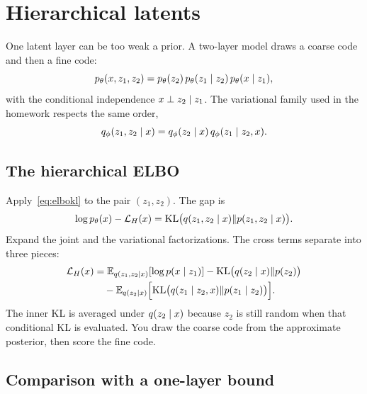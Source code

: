 \chapter{Hierarchical latents}
\label{ch:hier}

One latent layer can be too weak a prior. A two-layer model draws a coarse code and then a fine code:
\[
p_\theta(x,z_1,z_2)=p_\theta(z_2)\,p_\theta(z_1\mid z_2)\,p_\theta(x\mid z_1),
\]
with the conditional independence $x\perp z_2\mid z_1$. The variational family used in the homework respects the same order,
\[
q_\phi(z_1,z_2\mid x)=q_\phi(z_2\mid x)\,q_\phi(z_1\mid z_2,x).
\]

\begin{center}
\end{center}

\section{The hierarchical ELBO}

Apply~\eqref{eq:elbokl} to the pair $(z_1,z_2)$. The gap is
\[
\log p_\theta(x)-\mathcal L_H(x)
=\mathrm{KL}\bigl(q(z_1,z_2\mid x)\Vert p(z_1,z_2\mid x)\bigr).
\]
Expand the joint and the variational factorizations. The cross terms separate into three pieces:
\begin{align*}
\mathcal L_H(x)
&=\mathbb{E}_{q(z_1,z_2\mid x)}[\log p(x\mid z_1)]
-\mathrm{KL}\bigl(q(z_2\mid x)\Vert p(z_2)\bigr)\\
&\quad-\mathbb{E}_{q(z_2\mid x)}\Bigl[\mathrm{KL}\bigl(q(z_1\mid z_2,x)\Vert p(z_1\mid z_2)\bigr)\Bigr].
\end{align*}
The inner KL is averaged under $q(z_2\mid x)$ because $z_2$ is still random when that conditional KL is evaluated. You draw the coarse code from the approximate posterior, then score the fine code.

\section{Comparison with a one-layer bound}

